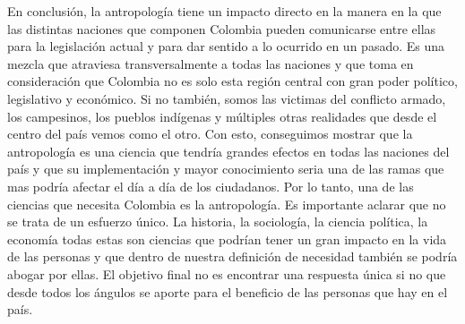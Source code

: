 \documentclass[12pt]{exam}
\begin{document}
En conclusión, la antropología tiene un impacto directo en la manera en la que las distintas naciones que componen Colombia pueden comunicarse entre ellas para la legislación actual y para dar sentido a lo ocurrido en un pasado. Es una mezcla que atraviesa transversalmente a todas las naciones y que toma en consideración que Colombia no es solo esta región central con gran poder político, legislativo y económico. Si no también, somos las victimas del conflicto armado, los campesinos, los pueblos indígenas y múltiples otras realidades que desde el centro del país vemos como el otro. Con esto, conseguimos mostrar que la antropología es una ciencia que tendría grandes efectos en todas las naciones del país y que su implementación y mayor conocimiento seria una de las ramas que mas podría afectar el día a día de los ciudadanos. Por lo tanto, una de las ciencias que necesita Colombia es la antropología. Es importante aclarar que no se trata de un esfuerzo único. La historia, la sociología, la ciencia política, la economía todas estas son ciencias que podrían tener un gran impacto en la vida de las personas y que dentro de nuestra definición de necesidad también se podría abogar por ellas. El objetivo final no es encontrar una respuesta única si no que desde todos los ángulos se aporte para el beneficio de las personas que hay en el país.

\printbibliography
\end{document}
